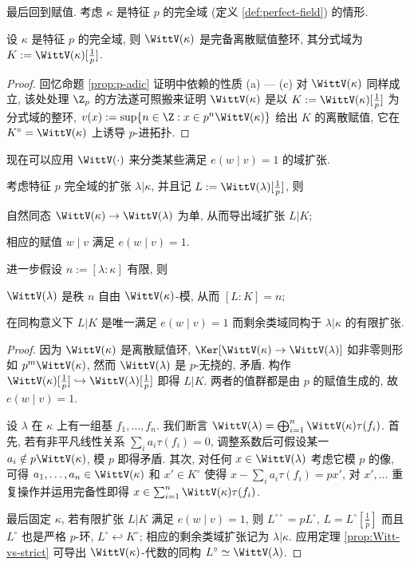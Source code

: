 最后回到赋值. 考虑 $\kappa$ 是特征 $p$ 的完全域 (定义 \ref{def:perfect-field}) 的情形.
\begin{proposition}
	设 $\kappa$ 是特征 $p$ 的完全域, 则 $\WittV(\kappa)$ 是完备离散赋值整环, 其分式域为 $K := \WittV(\kappa)[\frac{1}{p}]$.
\end{proposition}
\begin{proof}
	回忆命题 \ref{prop:p-adic} 证明中依赖的性质 (a) --- (c) 对 $\WittV(\kappa)$ 同样成立, 该处处理 $\Z_p$ 的方法遂可照搬来证明 $\WittV(\kappa)$ 是以 $K := \WittV(\kappa)[\frac{1}{p}]$ 为分式域的整环, $v(x) := \sup\{ n \in \Z : x \in p^n \WittV(\kappa) \}$ 给出 $K$ 的离散赋值, 它在 $K^\circ = \WittV(\kappa)$ 上诱导 $p$-进拓扑.
\end{proof}

现在可以应用 $\WittV(\cdot)$ 来分类某些满足 $e(w \mid v)=1$ 的域扩张.
\begin{proposition}
	考虑特征 $p$ 完全域的扩张 $\lambda | \kappa$, 并且记 $L := \WittV(\lambda)[\frac{1}{p}]$, 则
	\begin{compactitem}
		\item 自然同态 $\WittV(\kappa) \to \WittV(\lambda)$ 为单, 从而导出域扩张 $L|K$;
		\item 相应的赋值 $w \mid v$ 满足 $e(w \mid v) = 1$.
	\end{compactitem}
	进一步假设 $n := [\lambda: \kappa]$ 有限, 则
	\begin{compactitem}
		\item $\WittV(\lambda)$ 是秩 $n$ 自由 $\WittV(\kappa)$-模, 从而 $[L:K]=n$;
		\item 在同构意义下 $L|K$ 是唯一满足 $e(w \mid v)=1$ 而剩余类域同构于 $\lambda|\kappa$ 的有限扩张.
	\end{compactitem}
\end{proposition}
\begin{proof}
	因为 $\WittV(\kappa)$ 是离散赋值环, $\Ker[\WittV(\kappa) \to \WittV(\lambda)]$ 如非零则形如 $p^m \WittV(\kappa)$, 然而 $\WittV(\lambda)$ 是 $p$-无挠的, 矛盾. 构作 $\WittV(\kappa)[\frac{1}{p}] \hookrightarrow \WittV(\lambda)[\frac{1}{p}]$ 即得 $L|K$. 两者的值群都是由 $p$ 的赋值生成的, 故 $e(w \mid v) = 1$.

	设 $\lambda$ 在 $\kappa$ 上有一组基 $f_1, \ldots, f_n$. 我们断言 $\WittV(\lambda) = \bigoplus_{i=1}^n \WittV(\kappa) \tau(f_i)$. 首先, 若有非平凡线性关系 $\sum_i a_i \tau(f_i) = 0$, 调整系数后可假设某一 $a_i \notin p\WittV(\kappa)$, 模 $p$ 即得矛盾. 其次, 对任何 $x \in \WittV(\lambda)$ 考虑它模 $p$ 的像, 可得 $a_1, \ldots, a_n \in \WittV(\kappa)$ 和 $x' \in K^\circ$ 使得 $x - \sum_i a_i \tau(f_i)  = px'$, 对 $x', \ldots$ 重复操作并运用完备性即得 $x \in \sum_{i=1}^n \WittV(\kappa) \tau(f_i)$.

	最后固定 $\kappa$, 若有限扩张 $L|K$ 满足 $e(w \mid v)=1$, 则 $L^{\circ\circ} = pL^\circ$, $L = L^\circ[\frac{1}{p}]$ 而且 $L^\circ$ 也是严格 $p$-环, $L^\circ \hookleftarrow K^\circ$; 相应的剩余类域扩张记为 $\lambda|\kappa$. 应用定理 \ref{prop:Witt-vs-strict} 可导出 $\WittV(\kappa)$-代数的同构 $L^\circ \simeq \WittV(\lambda)$.
\end{proof}


